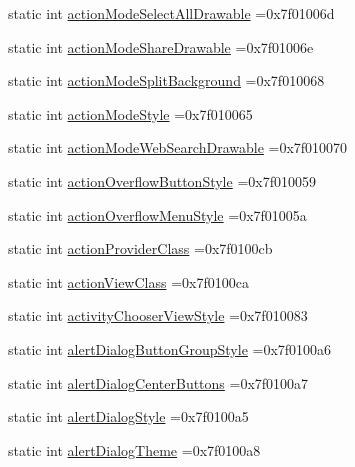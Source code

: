\begin{DoxyCompactItemize}
\item 
static int \hyperlink{classandroid_1_1support_1_1v4_1_1R_1_1attr_a2929ce0a70ac3302a375444e27907f6c}{action\+Mode\+Select\+All\+Drawable} =0x7f01006d
\item 
static int \hyperlink{classandroid_1_1support_1_1v4_1_1R_1_1attr_ace6b57b0bac24578fdda081a9f2f05b9}{action\+Mode\+Share\+Drawable} =0x7f01006e
\item 
static int \hyperlink{classandroid_1_1support_1_1v4_1_1R_1_1attr_af329d9724510b9158c62da58f2adf444}{action\+Mode\+Split\+Background} =0x7f010068
\item 
static int \hyperlink{classandroid_1_1support_1_1v4_1_1R_1_1attr_a718477cf455efe9593ccf7d102a1eeb6}{action\+Mode\+Style} =0x7f010065
\item 
static int \hyperlink{classandroid_1_1support_1_1v4_1_1R_1_1attr_ab88c21eea7bf54bfd711c9326ca83fc3}{action\+Mode\+Web\+Search\+Drawable} =0x7f010070
\item 
static int \hyperlink{classandroid_1_1support_1_1v4_1_1R_1_1attr_a32592f9d2b2349d58f91a3caf7a05337}{action\+Overflow\+Button\+Style} =0x7f010059
\item 
static int \hyperlink{classandroid_1_1support_1_1v4_1_1R_1_1attr_adc55e21231727981af7f193f97233f39}{action\+Overflow\+Menu\+Style} =0x7f01005a
\item 
static int \hyperlink{classandroid_1_1support_1_1v4_1_1R_1_1attr_a49f63fe97c5151a21fa424c599c51354}{action\+Provider\+Class} =0x7f0100cb
\item 
static int \hyperlink{classandroid_1_1support_1_1v4_1_1R_1_1attr_a9db9f5e44ffd00051c6d74e396af5a02}{action\+View\+Class} =0x7f0100ca
\item 
static int \hyperlink{classandroid_1_1support_1_1v4_1_1R_1_1attr_a7b486bbf67b2e1692b9e51eafcbe82d1}{activity\+Chooser\+View\+Style} =0x7f010083
\item 
static int \hyperlink{classandroid_1_1support_1_1v4_1_1R_1_1attr_aff1b8dace5d14ac0be03f8d0e93f1646}{alert\+Dialog\+Button\+Group\+Style} =0x7f0100a6
\item 
static int \hyperlink{classandroid_1_1support_1_1v4_1_1R_1_1attr_ab442f1d86be2bfb0af44b257ac0b224a}{alert\+Dialog\+Center\+Buttons} =0x7f0100a7
\item 
static int \hyperlink{classandroid_1_1support_1_1v4_1_1R_1_1attr_aa29cc93214bbf145ac5599924699a1dc}{alert\+Dialog\+Style} =0x7f0100a5
\item 
static int \hyperlink{classandroid_1_1support_1_1v4_1_1R_1_1attr_a3e3e081108a98146034d802e2e42bb9b}{alert\+Dialog\+Theme} =0x7f0100a8

\end{DoxyCompactItemize}

